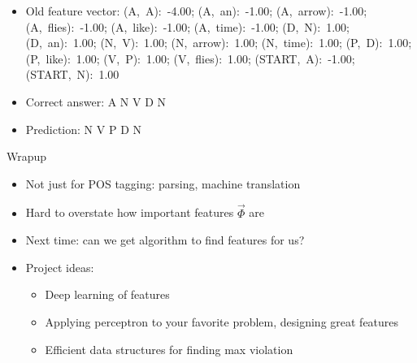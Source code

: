 \documentclass[compress]{beamer}
\begin{document}
\begin{frame}
\begin{itemize}
\item Old feature vector: (A,~A):~-4.00; (A,~an):~-1.00; (A,~arrow):~-1.00; (A,~flies):~-1.00; (A,~like):~-1.00; (A,~time):~-1.00; (D,~N):~1.00; (D,~an):~1.00; (N,~V):~1.00; (N,~arrow):~1.00; (N,~time):~1.00; (P,~D):~1.00; (P,~like):~1.00; (V,~P):~1.00; (V,~flies):~1.00; (START,~A):~-1.00; (START,~N):~1.00
\item Correct answer: A N V D N
\item Prediction: \alert<2>{N} \alert<2>{V} \alert<2>{P} D N
\end{itemize}
\end{frame}



\begin{frame}{Wrapup}

  \begin{itemize}
    \item Not just for POS tagging: parsing, machine translation
    \item Hard to overstate how important features $\vec \Phi$ are
    \item Next time: can we get algorithm to find features for us?
      \pause
    \item Project ideas:
      \begin{itemize}
        \item Deep learning of features
        \item Applying perceptron to your favorite problem, designing
          great features
        \item Efficient data structures for finding max violation
      \end{itemize}
  \end{itemize}

\end{frame}
\end{document}
